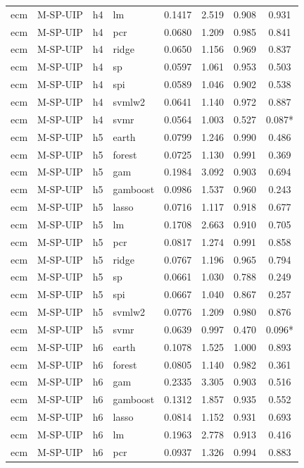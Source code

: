 \begin{ThreePartTable}
\begin{longtable}[t]{llclcccc}
ecm & M-SP-UIP & h4 & lm & 0.1417 & 2.519 & 0.908 & 0.931\\
ecm & M-SP-UIP & h4 & pcr & 0.0680 & 1.209 & 0.985 & 0.841\\
ecm & M-SP-UIP & h4 & ridge & 0.0650 & 1.156 & 0.969 & 0.837\\
ecm & M-SP-UIP & h4 & sp & 0.0597 & 1.061 & 0.953 & 0.503\\
ecm & M-SP-UIP & h4 & spi & 0.0589 & 1.046 & 0.902 & 0.538\\
ecm & M-SP-UIP & h4 & svmlw2 & 0.0641 & 1.140 & 0.972 & 0.887\\
ecm & M-SP-UIP & h4 & svmr & 0.0564 & 1.003 & 0.527 & 0.087*\\
\addlinespace
ecm & M-SP-UIP & h5 & earth & 0.0799 & 1.246 & 0.990 & 0.486\\
ecm & M-SP-UIP & h5 & forest & 0.0725 & 1.130 & 0.991 & 0.369\\
ecm & M-SP-UIP & h5 & gam & 0.1984 & 3.092 & 0.903 & 0.694\\
ecm & M-SP-UIP & h5 & gamboost & 0.0986 & 1.537 & 0.960 & 0.243\\
ecm & M-SP-UIP & h5 & lasso & 0.0716 & 1.117 & 0.918 & 0.677\\
ecm & M-SP-UIP & h5 & lm & 0.1708 & 2.663 & 0.910 & 0.705\\
ecm & M-SP-UIP & h5 & pcr & 0.0817 & 1.274 & 0.991 & 0.858\\
ecm & M-SP-UIP & h5 & ridge & 0.0767 & 1.196 & 0.965 & 0.794\\
ecm & M-SP-UIP & h5 & sp & 0.0661 & 1.030 & 0.788 & 0.249\\
ecm & M-SP-UIP & h5 & spi & 0.0667 & 1.040 & 0.867 & 0.257\\
ecm & M-SP-UIP & h5 & svmlw2 & 0.0776 & 1.209 & 0.980 & 0.876\\
ecm & M-SP-UIP & h5 & svmr & 0.0639 & 0.997 & 0.470 & 0.096*\\
\addlinespace
ecm & M-SP-UIP & h6 & earth & 0.1078 & 1.525 & 1.000 & 0.893\\
ecm & M-SP-UIP & h6 & forest & 0.0805 & 1.140 & 0.982 & 0.361\\
ecm & M-SP-UIP & h6 & gam & 0.2335 & 3.305 & 0.903 & 0.516\\
ecm & M-SP-UIP & h6 & gamboost & 0.1312 & 1.857 & 0.935 & 0.552\\
ecm & M-SP-UIP & h6 & lasso & 0.0814 & 1.152 & 0.931 & 0.693\\
ecm & M-SP-UIP & h6 & lm & 0.1963 & 2.778 & 0.913 & 0.416\\
ecm & M-SP-UIP & h6 & pcr & 0.0937 & 1.326 & 0.994 & 0.883\\

\end{longtable}
\end{ThreePartTable}
